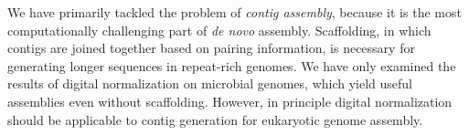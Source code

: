 \documentclass{pnastwo}
\begin{document}
\begin{article}
We have primarily tackled the problem of {\em contig assembly},
because it is the most computationally challenging part of {\em de
  novo} assembly.  Scaffolding, in which contigs are joined together
based on pairing information, is necessary for generating longer
sequences in repeat-rich genomes.  We have only examined the results
of digital normalization on microbial genomes, which yield useful
assemblies even without scaffolding.  However, in principle digital
normalization should be applicable to contig generation for eukaryotic
genome assembly.

%
%

\end{article}
\end{document}
